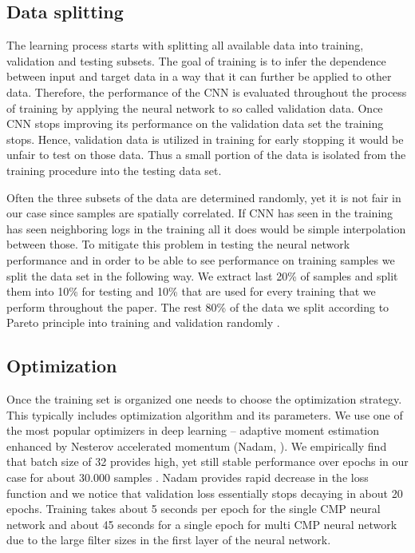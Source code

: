 \documentclass[paper,twocolomn]{geophysics}
\begin{document}
\subsection{Data splitting}
The learning process starts with splitting all available data into training, validation and testing subsets. 
The goal of training is
to infer the dependence between input and target data in a way that it can further be applied to other data. Therefore, the performance of the CNN is evaluated throughout the process of training by applying the neural network to so called validation data. Once CNN stops improving its performance on the validation data set the training stops. Hence, validation data is utilized in training for early stopping it would be unfair to test on those data. Thus a small portion of the data is isolated from the training procedure into the testing data set. 

Often the three subsets of the data are determined randomly, yet it is not fair in our case since samples are spatially correlated. If CNN has seen in the training has seen neighboring logs in the training all it does would be simple interpolation between those. To mitigate this problem in testing the neural network performance and in order to be able to see performance on training samples we split the data set in the following way. We extract last 20\% of samples and split them into 10\% for testing and 10\% that are used for every training that we perform throughout the paper. The rest 80\% of the data we split according to Pareto principle \citep{dunford2014pareto} into training and validation randomly . 


\subsection{Optimization}
Once the training set is organized one needs to choose the optimization strategy. This typically includes optimization algorithm and its parameters. We use one of the most popular optimizers in deep learning -- adaptive moment estimation enhanced by Nesterov accelerated momentum (Nadam, \cite{dozat2016incorporating}). We empirically find that batch size of 32 provides high, yet still stable performance over epochs in our case for about 30.000 samples . Nadam provides rapid decrease in the loss function and we notice that validation loss essentially stops decaying in about 20 epochs. Training takes about 5 seconds per epoch for the single CMP neural network and about 45 seconds for a single epoch for multi CMP neural network due to the large filter sizes in the first layer of the neural network.
\end{document}
